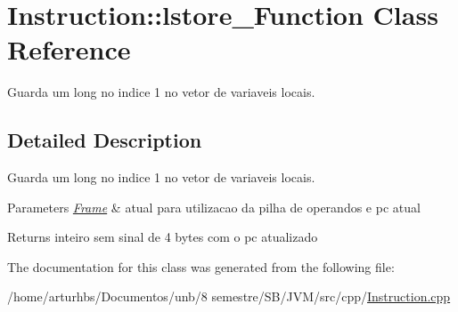 \hypertarget{classInstruction_1_1lstore__1Function}{}\section{Instruction\+:\+:lstore\+\_\+Function Class Reference}
\label{classInstruction_1_1lstore__1Function}


Guarda um long no indice 1 no vetor de variaveis locais.  




\subsection{Detailed Description}
Guarda um long no indice 1 no vetor de variaveis locais. 


\begin{DoxyParams}{Parameters}
{\em \hyperlink{classFrame}{Frame}} & atual para utilizacao da pilha de operandos e pc atual \\
\hline
\end{DoxyParams}
\begin{DoxyReturn}{Returns}
inteiro sem sinal de 4 bytes com o pc atualizado 
\end{DoxyReturn}


The documentation for this class was generated from the following file\+:\begin{DoxyCompactItemize}
\item 
/home/arturhbs/\+Documentos/unb/8 semestre/\+S\+B/\+J\+V\+M/src/cpp/\hyperlink{Instruction_8cpp}{Instruction.\+cpp}\end{DoxyCompactItemize}
